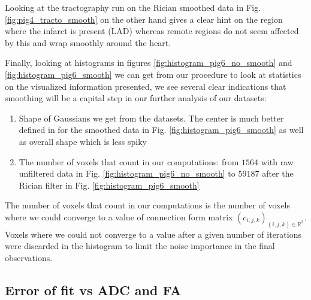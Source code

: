 Looking at the tractography run on the Rician smoothed data in Fig. \ref{fig:pig4_tracto_smooth} on the other hand gives a clear hint on the region where the infarct is present (LAD) whereas remote regions do not seem affected by this and wrap smoothly around the heart.

Finally, looking at histograms in figures \ref{fig:histogram_pig6_no_smooth} and \ref{fig:histogram_pig6_smooth} we can get from our procedure to look at statistics on the visualized information presented, we see several clear indications that smoothing will be a capital step in our further analysis of our datasets:
\begin{enumerate}
    \item Shape of Gaussians we get from the datasets. The center is much better defined in for the smoothed data in Fig. \ref{fig:histogram_pig6_smooth} as well as overall shape which is less spiky
    \item The number of voxels that count in our computations: from $1564$ with raw unfiltered data in Fig. \ref{fig:histogram_pig6_no_smooth} to $59187$ after the Rician filter in Fig. \ref{fig:histogram_pig6_smooth}
\end{enumerate}
The number of voxels that count in our computations is the number of voxels where we could converge to a value of connection form matrix $(c_{i, j, k})_{(i, j, k) \in \mathbb{R}^3}$. Voxels where we could not converge to a value after a given number of iterations were discarded in the histogram to limit the noise importance in the final observations.

\subsection{Error of fit vs ADC and FA}

